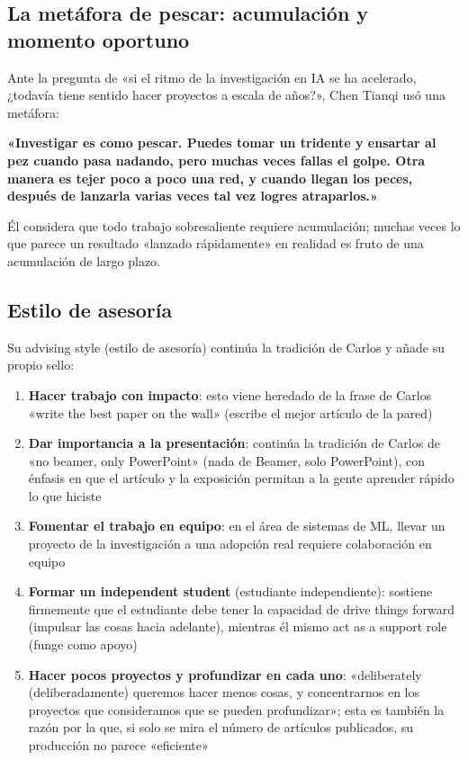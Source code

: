 \documentclass[a4paper]{article}
\begin{document}
\subsection{La metáfora de pescar: acumulación y momento oportuno}

Ante la pregunta de «si el ritmo de la investigación en IA se ha acelerado, ¿todavía tiene sentido hacer proyectos a escala de años?», Chen Tianqi usó una metáfora:

\textbf{«Investigar es como pescar. Puedes tomar un tridente y ensartar al pez cuando pasa nadando, pero muchas veces fallas el golpe. Otra manera es tejer poco a poco una red, y cuando llegan los peces, después de lanzarla varias veces tal vez logres atraparlos.»}

Él considera que todo trabajo sobresaliente requiere acumulación; muchas veces lo que parece un resultado «lanzado rápidamente» en realidad es fruto de una acumulación de largo plazo.

\subsection{Estilo de asesoría}

Su advising style (estilo de asesoría) continúa la tradición de Carlos y añade su propio sello:

\begin{enumerate}
    \item \textbf{Hacer trabajo con impacto}: esto viene heredado de la frase de Carlos «write the best paper on the wall» (escribe el mejor artículo de la pared)
    \item \textbf{Dar importancia a la presentación}: continúa la tradición de Carlos de «no beamer, only PowerPoint» (nada de Beamer, solo PowerPoint), con énfasis en que el artículo y la exposición permitan a la gente aprender rápido lo que hiciste
    \item \textbf{Fomentar el trabajo en equipo}: en el área de sistemas de ML, llevar un proyecto de la investigación a una adopción real requiere colaboración en equipo
    \item \textbf{Formar un independent student} (estudiante independiente): sostiene firmemente que el estudiante debe tener la capacidad de drive things forward (impulsar las cosas hacia adelante), mientras él mismo act as a support role (funge como apoyo)
    \item \textbf{Hacer pocos proyectos y profundizar en cada uno}: «deliberately (deliberadamente) queremos hacer menos cosas, y concentrarnos en los proyectos que consideramos que se pueden profundizar»; esta es también la razón por la que, si solo se mira el número de artículos publicados, su producción no parece «eficiente»
\end{enumerate}
\end{document}
